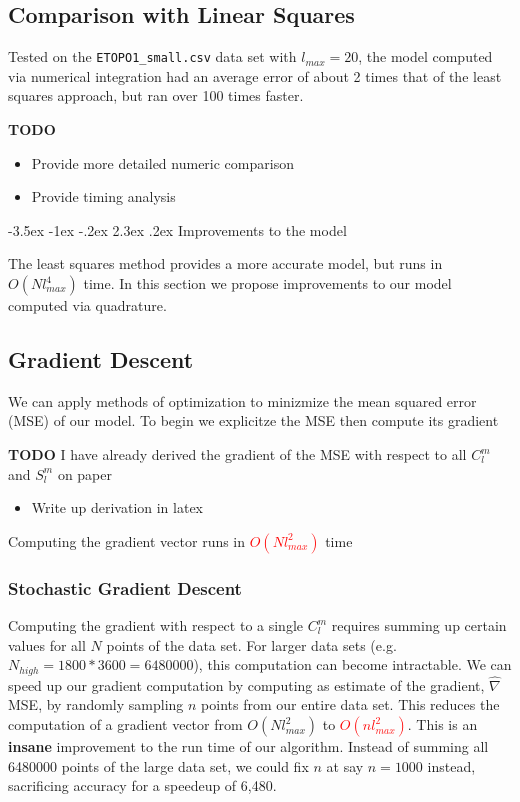 \documentclass[a4paper]{article}
\makeatletter
\renewcommand\section{\@startsection{section}{1}{\z@}%
                                  {-3.5ex \@plus -1ex \@minus -.2ex}%
                                  {2.3ex \@plus.2ex}%
                                  {\normalfont\normalsize\bfseries}}
\theoremstyle{definition}
\makeatother
\begin{document}
\subsection{Comparison with Linear Squares}

Tested on the \verb|ETOPO1_small.csv| data set with $l_{max} = 20$, the model computed via numerical integration had an average error of about 2 times that of the least squares approach, but ran over 100 times faster.

\textbf{TODO}
\begin{itemize}
    \item Provide more detailed numeric comparison
    \item Provide timing analysis
\end{itemize}

\section{Improvements to the model}

The least squares method provides a more accurate model, but runs in $O(Nl^4_{max})$ time. In this section we propose improvements to our model computed via quadrature.

\subsection{Gradient Descent}

We can apply methods of optimization to minizmize the mean squared error (MSE) of our model. To begin we explicitze the MSE then compute its gradient



\textbf{TODO} I have already derived the gradient of the MSE with respect to all $C_l^m$ and $S_l^m$ on paper
\begin{itemize}
    \item Write up derivation in latex
\end{itemize}

Computing the gradient vector runs in \textcolor{red}{$O(Nl_{max}^2)$} time


\subsubsection{Stochastic Gradient Descent}

Computing the gradient with respect to a single $C_l^m$ requires summing up certain values for all $N$ points of the data set. For larger data sets (e.g. $N_{high} = 1800 * 3600 = 6480000$), this
computation can become intractable. We can speed up our gradient computation by computing as estimate of the gradient, $\hat\nabla$MSE, by randomly sampling $n$ points from our entire
data set. This reduces the computation of a gradient vector from $O(Nl_{max}^2)$ to \textcolor{red}{$O(nl_{max}^2)$}. This is an \textbf{insane} improvement to the run time of our algorithm.
Instead of summing all 6480000 points of the large data set, we could fix $n$ at say $n = 1000$ instead, sacrificing accuracy for a speedeup of 6,480.
\end{document}
